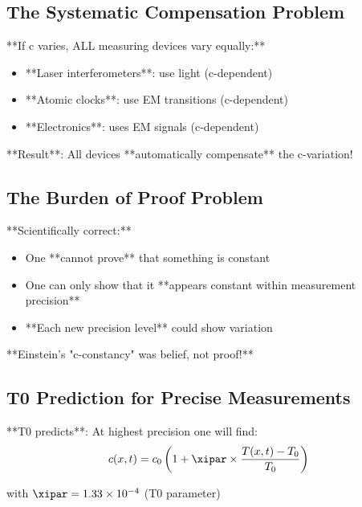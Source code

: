 \documentclass[12pt,a4paper]{article}
\newcommand{\Tfield}{T}
\begin{document}
{{{{{{{{{{											\subsection{The Systematic Compensation Problem}
											
											**If c varies, ALL measuring devices vary equally:**
											\begin{itemize}
												\item **Laser interferometers**: use light (c-dependent)
												\item **Atomic clocks**: use EM transitions (c-dependent)
												\item **Electronics**: uses EM signals (c-dependent)
											\end{itemize}
											
											**Result**: All devices **automatically compensate** the c-variation!
											
											\subsection{The Burden of Proof Problem}
											
											**Scientifically correct:**
											\begin{itemize}
												\item One **cannot prove** that something is constant
												\item One can only show that it **appears constant within measurement precision**
												\item **Each new precision level** could show variation
											\end{itemize}
											
											**Einstein's "c-constancy" was belief, not proof!**
											
											\subsection{T0 Prediction for Precise Measurements}
											
											**T0 predicts**: At highest precision one will find:
											\begin{equation}
												c(x,t) = c_0 \left(1 + \xipar \times \frac{\Tfield(x,t) - \Tfield_0}{\Tfield_0}\right)
											\end{equation}
											
											with $\xipar = 1.33 \times 10^{-4}$ (T0 parameter)
											
}}}}}}}}}}
\end{document}
